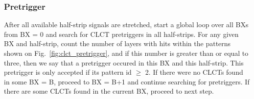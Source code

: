 \subsubsection{Pretrigger}

After all available half-strip signals are stretched, start a global loop over all BXs from BX = 0 and search for CLCT pretriggers in all half-strips. For any given BX and half-strip, count the number of layers with hits within the patterns shown on Fig.~\ref{fig:clct_pretrigger}, and if this number is greater than or equal to three, then we say that a pretrigger occured in this BX and this half-strip. This pretrigger is only accepted if its pattern id $\geq$ 2. If there were no CLCTs found in some BX = B, proceed to BX = B+1 and continue searching for pretriggers. If there are some CLCTs found in the current BX, proceed to next step.

